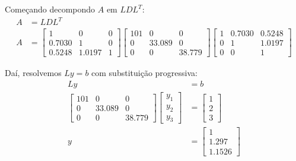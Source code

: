 \documentclass[12pt]{article}
\begin{document}
Começando decompondo \(A\) em \(LDL^T\):
\begin{align*}
    A &= LDL^T \\
    A &=
    \begin{bmatrix}
        1 & 0 & 0 \\
        0.7030 & 1 & 0 \\
        0.5248 & 1.0197 & 1
    \end{bmatrix}
    \begin{bmatrix}
        101 & 0 & 0 \\
        0 & 33.089 & 0 \\
        0 & 0 & 38.779
    \end{bmatrix}
    \begin{bmatrix}
        1 & 0.7030 & 0.5248 \\
        0 & 1 & 1.0197 \\
        0 & 0 & 1
    \end{bmatrix}
\end{align*}

Daí, resolvemos \(Ly = b\) com substituição progressiva:
\begin{align*}
    Ly &= b \\
    \begin{bmatrix}
        101 & 0 & 0 \\
        0 & 33.089 & 0 \\
        0 & 0 & 38.779
    \end{bmatrix}
    \begin{bmatrix}
        y_1 \\
        y_2 \\
        y_3
    \end{bmatrix}
    &=
    \begin{bmatrix}
        1 \\
        2 \\
        3
    \end{bmatrix} \\
    y &=
    \begin{bmatrix}
        1 \\
        1.297 \\
        1.1526
    \end{bmatrix}
\end{align*}
\end{document}
